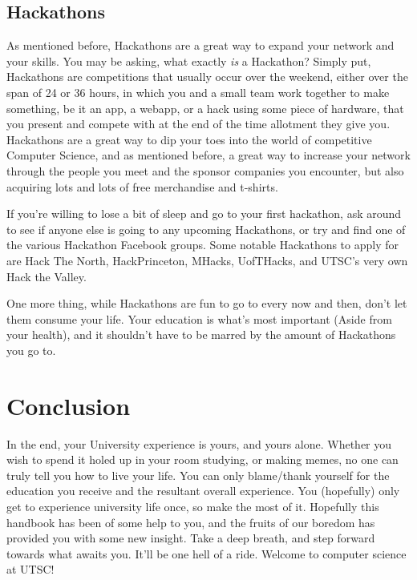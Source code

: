 \documentclass[11pt]{article}
\begin{document}
\subsection{Hackathons}
As mentioned before, Hackathons are a great way to expand your network and your skills.  You may be asking, what exactly \textit{is} a Hackathon?  Simply put, Hackathons are competitions that usually occur over the weekend, either over the span of 24 or 36 hours, in which you and a small team work together to make something, be it an app, a webapp, or a hack using some piece of hardware, that you present and compete with at the end of the time allotment they give you.  Hackathons are a great way to dip your toes into the world of competitive Computer Science, and as mentioned before, a great way to increase your network through the people you meet and the sponsor companies you encounter, but also acquiring lots and lots of free merchandise and t-shirts.\par
If you're willing to lose a bit of sleep and go to your first hackathon, ask around to see if anyone else is going to any upcoming Hackathons, or try and find one of the various Hackathon Facebook groups.  Some notable Hackathons to apply for are Hack The North, HackPrinceton, MHacks, UofTHacks, and UTSC's very own Hack the Valley.\par
One more thing, while Hackathons are fun to go to every now and then, don't let them consume your life.  Your education is what's most important (Aside from your health), and it shouldn't have to be marred by the amount of Hackathons you go to.

\section{Conclusion}
In the end, your University experience is yours, and yours alone.  Whether you wish to spend it holed up in your room studying, or making memes, no one can truly tell you how to live your life. You can only blame/thank yourself for the education you receive and the resultant overall experience. You (hopefully) only get to experience university life once, so make the most of it.  Hopefully this handbook has been of some help to you, and the fruits of our boredom has provided you with some new insight.  Take a deep breath, and step forward towards what awaits you. It'll be one hell of a ride. Welcome to computer science at UTSC!
\end{document}
